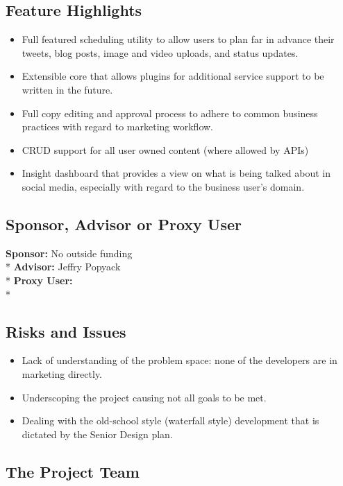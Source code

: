 \documentclass{article}
\begin{document}
\subsection*{Feature Highlights}
\begin{itemize}
  \item Full featured scheduling utility to allow users to plan far in advance their tweets, blog posts, image and video uploads, and status updates.
  \item Extensible core that allows plugins for additional service support to be written in the future.
  \item Full copy editing and approval process to adhere to common business practices with regard to marketing workflow.
  \item CRUD support for all user owned content (where allowed by APIs)
  \item Insight dashboard that provides a view on what is being talked about in social media, especially with regard to the business user's domain.
\end{itemize}

\subsection*{Sponsor, Advisor or Proxy User}

\textbf{Sponsor:} No outside funding \\*
\textbf{Advisor:} Jeffry Popyack \\*
\textbf{Proxy User:} \\*

\subsection*{Risks and Issues}

\begin{itemize}
  \item Lack of understanding of the problem space: none of the developers are in marketing directly.
  \item Underscoping the project causing not all goals to be met.
  \item Dealing with the old-school style (waterfall style) development that is dictated by the Senior Design plan.
\end{itemize}

\subsection*{The Project Team}
\end{document}
